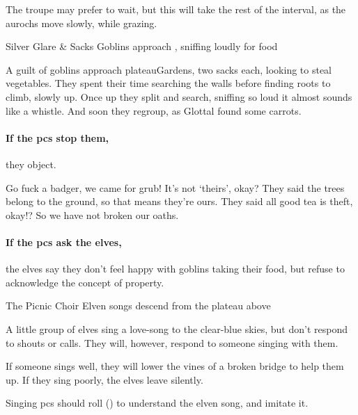 The troupe may prefer to wait, but this will take the rest of the \gls{interval}, as the aurochs move slowly, while grazing.

{Silver Glare \& Sacks}%
{Goblins approach , sniffing loudly for food}%

A guilt of goblins approach \gls{plateauGardens}, two sacks each, looking to steal vegetables.
They spent their time searching the walls before finding roots to climb, slowly up.
Once up they split and search, sniffing so loud it almost sounds like a whistle.
And soon they regroup, as Glottal found some carrots.

\paragraph{If the \glspl{pc} stop them,}
they object.

\begin{speechtext}
  Go fuck a badger, we came for grub!
  It's not `theirs', okay?
  They said the trees belong to the ground, so that means they're ours.
  They said all good tea is theft, okay!?
  So we have not broken our oaths.
\end{speechtext}



\paragraph{If the \glspl{pc} ask the elves,}
the elves say they don't feel happy with goblins taking their food, but refuse to acknowledge the concept of property.

{The Picnic Choir}%
{Elven songs descend from the plateau above}%

A little group of elves sing a love-song to the clear-blue skies, but don't respond to shouts or calls.
They will, however, respond to someone singing with them.

If someone sings well, they will lower the vines of a broken bridge to help them up.
If they sing poorly, the elves leave silently.

Singing \glspl{pc} should roll  (\tn[10]) to understand the elven song, and imitate it.

